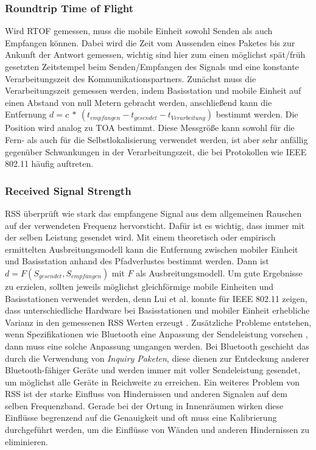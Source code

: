 \subsubsection{Roundtrip Time of Flight}
Wird RTOF gemessen, muss die mobile Einheit sowohl Senden als auch Empfangen können. 
Dabei wird die Zeit vom Aussenden eines Paketes bis zur Ankunft der Antwort gemessen, wichtig sind hier zum einen möglichst spät/früh gesetzten Zeitstempel beim Senden/Empfangen des Signals und eine konstante Verarbeitungszeit des Kommunikationspartners. 
Zunächst muss die Verarbeitungszeit gemessen werden, indem Basisstation und mobile Einheit auf einen Abstand von null Metern gebracht werden, anschließend kann die Entfernung $d = c\ *\ (t_{empfangen} - t_{gesendet} - t_{Verarbeitung})$ bestimmt werden. 
Die Position wird analog zu TOA bestimmt. Diese Messgröße kann sowohl für die Fern- als auch für die Selbstlokalisierung verwendet werden, ist aber sehr anfällig gegenüber Schwankungen in der Verarbeitungszeit, die bei Protokollen wie IEEE 802.11 häufig auftreten. 

\subsubsection{Received Signal Strength}
RSS überprüft wie stark das empfangene Signal aus dem allgemeinen Rauschen auf der verwendeten Frequenz hervorsticht. 
Dafür ist es wichtig, dass immer mit der selben Leistung gesendet wird. 
Mit einem theoretisch oder empirisch ermittelten Ausbreitungsmodell kann die Entfernung zwischen mobiler Einheit und Basisstation anhand des Pfadverlustes bestimmt werden. 
Dann ist $d = F(S_{gesendet},S_{empfangen})$ mit $F$ als Ausbreitungsmodell. 
Um gute Ergebnisse zu erzielen, sollten jeweils möglichst gleichförmige mobile Einheiten und Basisstationen verwendet werden, denn Lui et al. konnte für IEEE 802.11 zeigen, dass unterschiedliche Hardware bei Basisstationen und mobiler Einheit erhebliche Varianz in den gemessenen RSS Werten erzeugt \cite{lui2011differences}. 
Zusätzliche Probleme entstehen, wenn Spezifikationen wie Bluetooth eine Anpassung der Sendeleistung vorsehen \cite{hossain2007comprehensive}, dann muss eine solche Anpassung umgangen werden. 
Bei Bluetooth geschieht das durch die Verwendung von \emph{Inquiry Paketen}, diese dienen zur Entdeckung anderer Bluetooth-fähiger Geräte und werden immer mit voller Sendeleistung gesendet, um möglichst alle Geräte in Reichweite zu erreichen.
Ein weiteres Problem von RSS ist der starke Einfluss von Hindernissen und anderen Signalen auf dem selben Frequenzband. 
Gerade bei der Ortung in Innenräumen wirken diese Einflüsse begrenzend auf die Genauigkeit und oft muss eine Kalibrierung durchgeführt werden, um die Einflüsse von Wänden und anderen Hindernissen zu eliminieren.



